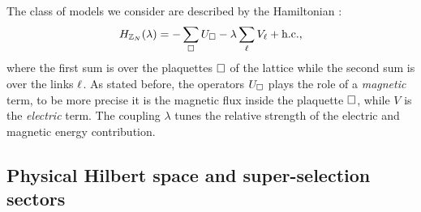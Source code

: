 The class of models we consider are described by the Hamiltonian \cite{tagliacozzo2011entanglement, hamma2008adiabatic, trebst2007topological}:
\begin{equation}
    H_{\mathbb{Z}_N}(\lambda) = - \sum_{\square} U_{\square} - \lambda \sum_{\ell} V_{\ell} + \text{h.c.},
    \label{eq:hamiltonian_base}
\end{equation}
where the first sum is over the plaquettes $\square$ of the lattice while the second sum is over the links $\ell$.
As stated before, the operators $U_{\square}$ plays the role of a \emph{magnetic} term, to be more precise it is the magnetic flux inside the plaquette $\square$, while $V$ is the \emph{electric} term.
The coupling $\lambda$ tunes the relative strength of the electric and magnetic energy contribution.

\begin{figure}[t]
\end{figure}


%
%
\subsection{Physical Hilbert space and super-selection sectors}
\label{sub:physical_hilbert_space_and_super_selection_sectors}


